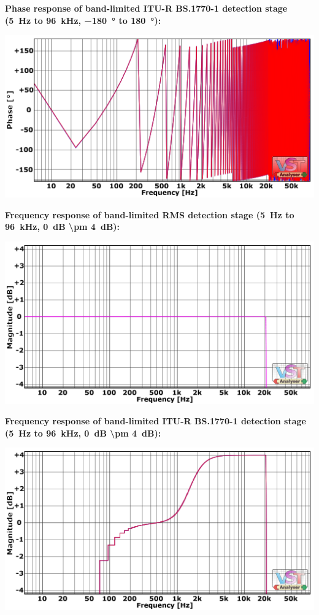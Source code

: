 \textbf{Phase response of band-limited ITU-R BS.1770-1 detection stage
  (\SI{5}{\hertz} to \SI{96}{\kilo\hertz}, \SI{-180}{\degree} to
  \SI[addsign]{+180}{\degree}):}

\begin{center}
  \includegraphics[scale=0.60,clip]{include/images/fft_192khz-phase-itu_r.png}
\end{center}

\newpage %

\textbf{Frequency response of band-limited RMS detection stage
  (\SI{5}{\hertz} to \SI{96}{\kilo\hertz}, \SI{0}{\dB} \SI{\pm
    4}{\dB}):}

\begin{center}
  \includegraphics[scale=0.60,clip]{include/images/fft_192khz-freq_zoomed-rms.png}
\end{center}

\textbf{Frequency response of band-limited ITU-R BS.1770-1 detection stage
  (\SI{5}{\hertz} to \SI{96}{\kilo\hertz}, \SI{0}{\dB} \SI{\pm
    4}{\dB}):}

\begin{center}
  \includegraphics[scale=0.60,clip]{include/images/fft_192khz-freq_zoomed-itu_r.png}
\end{center}

